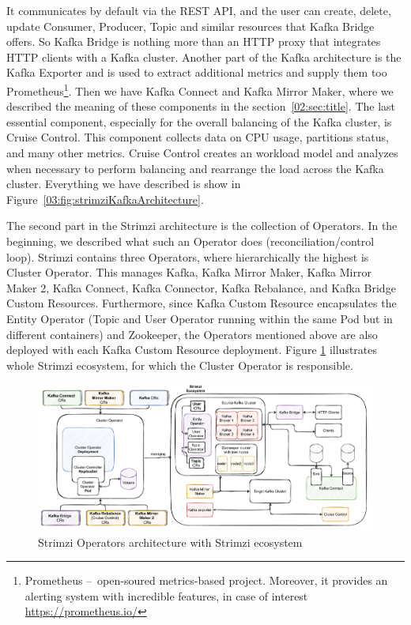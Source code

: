 It communicates by default via the REST API, and the user can create, delete, update Consumer, Producer, Topic and similar resources that Kafka Bridge offers.
 So Kafka Bridge is nothing more than an HTTP proxy that integrates HTTP clients with a Kafka cluster.
 Another part of the Kafka architecture is the Kafka Exporter and is used to extract additional metrics and supply them too Prometheus\footnote{Prometheus \---\ open-soured metrics-based project. Moreover, it provides an alerting system with incredible features, in case of interest \url{https://prometheus.io/}}.
 Then we have Kafka Connect and Kafka Mirror Maker, where we described the meaning of these components in the section~\ref{02:sec:title}.
 The last essential component, especially for the overall balancing of the Kafka cluster, is Cruise Control.
 This component collects data on CPU usage, partitions status, and many other metrics.
 Cruise Control creates an workload model and analyzes when necessary to perform balancing and rearrange the load across the Kafka cluster.
 Everything we have described is show in Figure~\ref{03:fig:strimziKafkaArchitecture}.

The second part in the Strimzi architecture is the collection of Operators.
In the beginning, we described what such an Operator does (reconciliation/control loop).
Strimzi contains three Operators, where hierarchically the highest is Cluster Operator.
This manages Kafka, Kafka Mirror Maker, Kafka Mirror Maker 2, Kafka Connect, Kafka Connector, Kafka Rebalance, and Kafka Bridge Custom Resources.
Furthermore, since Kafka Custom Resource encapsulates the Entity Operator (Topic and User Operator running within the same Pod but in different containers) and Zookeeper, the Operators mentioned above are also deployed with each Kafka Custom Resource deployment.
Figure \ref{03:fig:strimziOperatorsArchitecture} illustrates whole Strimzi ecosystem, for which the Cluster Operator is responsible.

\begin{figure}[!ht]
    \centering
    \includegraphics[scale=0.60]{obrazky-figures/02-preliminaries/03-strimzi/04-stirmziOperatorsArch}
    \caption{Strimzi Operators architecture with Strimzi ecosystem}
    \label{03:fig:strimziOperatorsArchitecture}
\end{figure}

